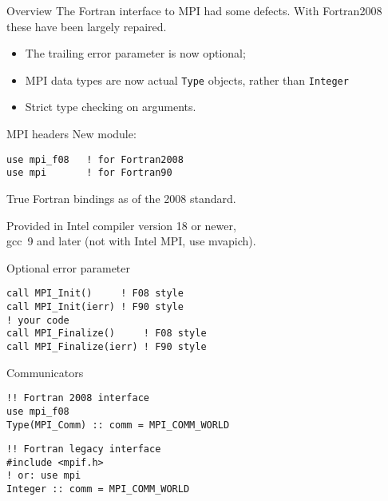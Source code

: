 
\lstset{language=Fortran}
\begin{numberedframe}{Overview}
  The Fortran interface to MPI had some defects.
  With Fortran2008 these have been largely repaired.
  \begin{itemize}
  \item The trailing error parameter is now optional;
  \item MPI data types are now actual \lstinline{Type} objects,
    rather than \lstinline{Integer}
  \item Strict type checking on arguments.
  \end{itemize}
\end{numberedframe}

\begin{numberedframe}{MPI headers}
\label{sl:mpi-header}
New module:
\begin{verbatim}
use mpi_f08   ! for Fortran2008
use mpi       ! for Fortran90
\end{verbatim}
True Fortran bindings as of the 2008 standard.
\begin{tacc}
  Provided in Intel compiler version 18 or newer,\\
  gcc~9 and later (not with Intel MPI, use mvapich).
\end{tacc}
\end{numberedframe}

\begin{numberedframe}{Optional error parameter}
\lstset{language=Fortran}
\begin{lstlisting}
call MPI_Init()     ! F08 style
call MPI_Init(ierr) ! F90 style
! your code
call MPI_Finalize()     ! F08 style
call MPI_Finalize(ierr) ! F90 style
\end{lstlisting}
\end{numberedframe}

\begin{numberedframe}{Communicators}
\begin{lstlisting}
!! Fortran 2008 interface
use mpi_f08
Type(MPI_Comm) :: comm = MPI_COMM_WORLD
\end{lstlisting}
\begin{lstlisting}
!! Fortran legacy interface
#include <mpif.h>
! or: use mpi
Integer :: comm = MPI_COMM_WORLD
\end{lstlisting}
\end{numberedframe}

